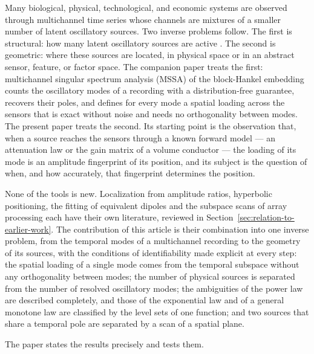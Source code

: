 \documentclass{article}
\begin{document}
Many biological, physical, technological, and economic systems are observed through multichannel time series whose channels are mixtures of a smaller number of latent oscillatory sources. Two inverse problems follow. The first is structural: how many latent oscillatory sources are active \cite{ref-BernadotteBuchstaber, ref-Bernadotte05}. The second is geometric: where these sources are located, in physical space or in an abstract sensor, feature, or factor space. The companion paper \cite{ref-companionA} treats the first: multichannel singular spectrum analysis (MSSA) of the block-Hankel embedding counts the oscillatory modes of a recording with a distribution-free guarantee, recovers their poles, and defines for every mode a spatial loading across the sensors that is exact without noise and needs no orthogonality between modes. The present paper treats the second. Its starting point is the observation that, when a source reaches the sensors through a known forward model --- an attenuation law or the gain matrix of a volume conductor --- the loading of its mode is an amplitude fingerprint of its position, and its subject is the question of when, and how accurately, that fingerprint determines the position.

None of the tools is new. Localization from amplitude ratios, hyperbolic positioning, the fitting of equivalent dipoles and the subspace scans of array processing each have their own literature, reviewed in Section~\ref{sec:relation-to-earlier-work}. The contribution of this article is their combination into one inverse problem, from the temporal modes of a multichannel recording to the geometry of its sources, with the conditions of identifiability made explicit at every step: the spatial loading of a single mode comes from the temporal subspace without any orthogonality between modes; the number of physical sources is separated from the number of resolved oscillatory modes; the ambiguities of the power law are described completely, and those of the exponential law and of a general monotone law are classified by the level sets of one function; and two sources that share a temporal pole are separated by a scan of a spatial plane.

The paper states the results precisely and tests them.
\end{document}
